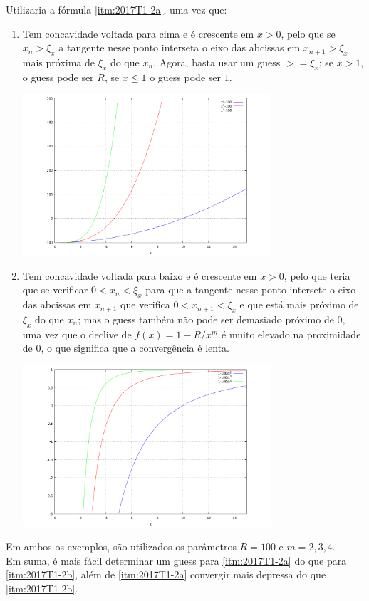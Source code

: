 Utilizaria a fórmula \ref{itm:2017T1-2a}, uma vez que:
\begin{enumerate}[label=\textbf{(\alph*)}]
	\item \label{itm:2017T1-2a} Tem concavidade voltada para cima e é crescente em $x > 0$, pelo que se $x_n > \xi_x$ a tangente nesse ponto interseta o eixo das abcissas em $x_{n+1} >\xi_x $ mais próxima de $\xi_x$ do que $x_n$. Agora, basta usar um guess $>= \xi_x$; se $x>1$, o guess pode ser $R$, se $x\leq1$ o guess pode ser $1$.
	\begin{center} \includegraphics[height=60mm,keepaspectratio]{plot2017T1-2a} \end{center}
	\item \label{itm:2017T1-2b} Tem concavidade voltada para baixo e é crescente em $x > 0$, pelo que teria que se verificar $0 < x_n < \xi_x$ para que a tangente nesse ponto intersete o eixo das abcissas em $x_{n+1}$ que verifica $0<x_{n+1}<\xi_x$ e que está mais próximo de $\xi_x$ do que $x_n$; mas o guess também não pode ser demasiado próximo de $0$, uma vez que o declive de $f(x)=1-R/x^m$ é muito elevado na proximidade de $0$, o que significa que a convergência é lenta.
	\begin{center} \includegraphics[height=60mm,keepaspectratio]{plot2017T1-2b} \end{center}
\end{enumerate}
Em ambos os exemplos, são utilizados os parâmetros $R=100$ e $m=2,3,4$.\\
Em suma, é mais fácil determinar um guess para \ref{itm:2017T1-2a} do que para \ref{itm:2017T1-2b}, além de \ref{itm:2017T1-2a} convergir mais depressa do que \ref{itm:2017T1-2b}.

